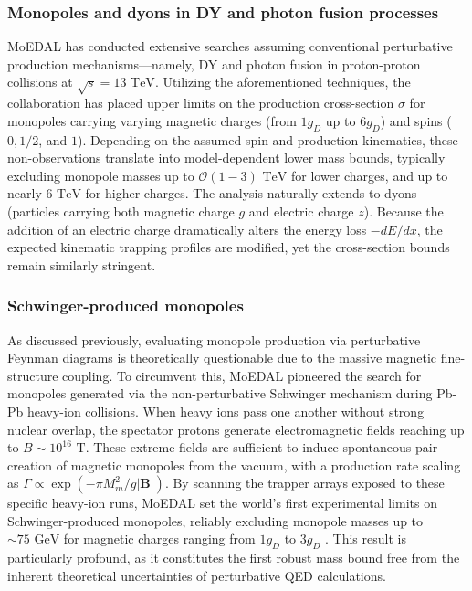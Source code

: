 \documentclass[a4paper,11pt]{article}
\begin{document}
\subsubsection{Monopoles and dyons in DY and photon fusion processes}
 MoEDAL has conducted extensive searches assuming conventional perturbative production mechanisms—namely, DY and photon fusion in proton-proton collisions at $\sqrt{s} = 13\text{ TeV}$. Utilizing the aforementioned techniques, the collaboration has placed upper limits on the production cross-section $\sigma$ for monopoles carrying varying magnetic charges (from $1g_D$ up to $6g_D$) and spins ($0, 1/2$, and $1$). Depending on the assumed spin and production kinematics, these non-observations translate into model-dependent lower mass bounds, typically excluding monopole masses up to $\mathcal{O}(1-3)\text{ TeV}$ for lower charges, and up to nearly $6\text{ TeV}$ for higher charges. The analysis naturally extends to dyons (particles carrying both magnetic charge $g$ and electric charge $z$). Because the addition of an electric charge dramatically alters the energy loss $-dE/dx$, the expected kinematic trapping profiles are modified, yet the cross-section bounds remain similarly stringent.
 
 \subsubsection{Schwinger-produced monopoles}
 As discussed previously, evaluating monopole production via perturbative Feynman diagrams is theoretically questionable due to the massive magnetic fine-structure coupling. To circumvent this, MoEDAL pioneered the search for monopoles generated via the non-perturbative Schwinger mechanism during Pb-Pb heavy-ion collisions. When heavy ions pass one another without strong nuclear overlap, the spectator protons generate electromagnetic fields reaching up to $B \sim 10^{16}\text{ T}$. These extreme fields are sufficient to induce spontaneous pair creation of magnetic monopoles from the vacuum, with a production rate scaling as $\Gamma \propto \exp(-\pi M_m^2 / g|\boldsymbol{B}|)$. By scanning the trapper arrays exposed to these specific heavy-ion runs, MoEDAL set the world's first experimental limits on Schwinger-produced monopoles, reliably excluding monopole masses up to $\sim 75\text{ GeV}$ for magnetic charges ranging from $1g_D$ to $3g_D$ \cite{MoEDAL2022}. This result is particularly profound, as it constitutes the first robust mass bound free from the inherent theoretical uncertainties of perturbative QED calculations.
\end{document}
